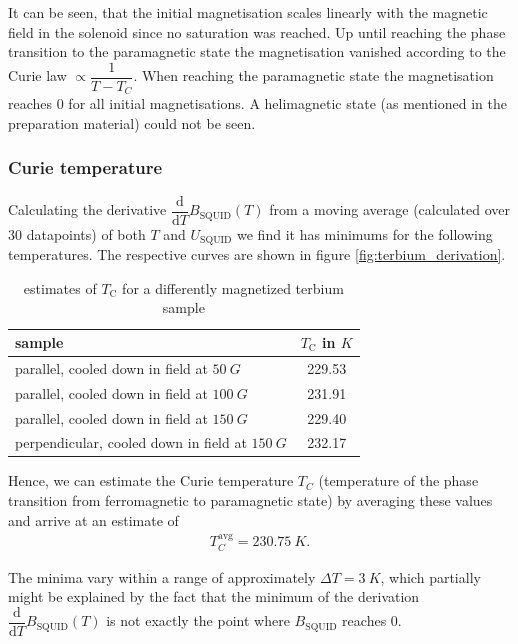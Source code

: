 \documentclass[paper=a4, fontsize=10pt]{scrartcl}
\begin{document}
It can be seen, that the initial magnetisation scales linearly with
the magnetic field in the solenoid since no saturation was reached. Up
until reaching the phase transition to the paramagnetic state the
magnetisation vanished according to the Curie law
$\propto \dfrac{1}{T-T_C}$. When reaching the paramagnetic state the
magnetisation reaches 0 for all initial magnetisations. A helimagnetic
state (as mentioned in the preparation material) could not be seen.


\subsubsection{Curie temperature}


Calculating the derivative
$\dfrac{\textrm{d}}{\textrm{d} T}B_{\mathrm{SQUID}}(T)$ from a moving
average (calculated over 30 datapoints) of both $T$ and
$U_{\mathrm{SQUID}}$ we find it has minimums for the following
temperatures. The respective curves are shown in figure
\ref{fig:terbium_derivation}.

\begin{table}[h]
  \centering
\begin{tabular}{l|c}
  sample & $T_{\mathrm{C}}$ in $\si{K}$\\
  \toprule
parallel, cooled down in field at $\SI{50}{G}$ & 229.53 \\
parallel, cooled down in field at $\SI{100}{G}$ & 231.91 \\
parallel, cooled down in field at $\SI{150}{G}$ & 229.40 \\
 perpendicular, cooled down in field at $\SI{150}{G}$ & 232.17 \\
  \bottomrule
\end{tabular}
\caption{estimates of $T_{\mathrm{C}}$ for a differently magnetized
  terbium sample}
\label{table:nickel-squid}
\end{table}
Hence, we can estimate the Curie temperature $T_C$ (temperature of the
phase transition from ferromagnetic to paramagnetic state) by
averaging these values and arrive at an estimate of
\begin{align*}
   T_C^{\mathrm{avg}} = \SI{230.75}{K}. 
\end{align*}

The minima vary within a range of approximately
$\Delta T = \SI{3}{K}$, which partially might be explained by the fact
that the minimum of the derivation
$\dfrac{\textrm{d}}{\textrm{d} T}B_{\mathrm{SQUID}}(T)$ is not exactly
the point where $B_{\mathrm{SQUID}}$ reaches 0.
\end{document}

